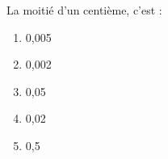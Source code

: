 La moitié d'un centième, c'est :
\begin{multicols}{5}
  \begin{enumerate}[A/]
  \item 0,005
  \item 0,002
  \item 0,05
  \item 0,02
  \item 0,5
  \end{enumerate}
\end{multicols}